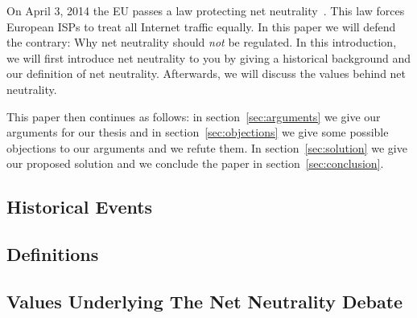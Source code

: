 
On April 3, 2014 the EU passes a law protecting net neutrality~\cite{whittaker2014eu}. This law forces European \acp{ISP} to treat all Internet traffic equally. In this paper we will defend the contrary: Why net neutrality should \emph{not} be regulated. In this introduction, we will first introduce net neutrality to you by giving a historical background and our definition of net neutrality. Afterwards, we will discuss the values behind net neutrality.

This paper then continues as follows: in section~\ref{sec:arguments} we give our arguments for our thesis and in section~\ref{sec:objections} we give some possible objections to our arguments and we refute them. In section~\ref{sec:solution} we give our proposed solution and we conclude the paper in section~\ref{sec:conclusion}.

\subsection{Historical Events}
\label{sec:intro_problem}


\subsection{Definitions}
\label{sec:intro_def}


\subsection{Values Underlying The Net Neutrality Debate}
\label{sec:intro_values}

